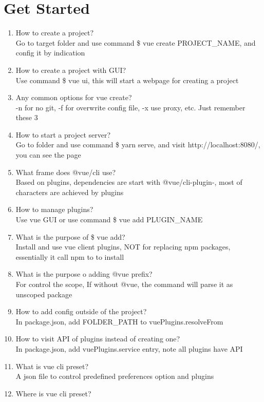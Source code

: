 \documentclass[10pt,a4paper,oneside]{article}
\begin{document}
\section{Get Started}
\begin{enumerate}[1.]
\item  How to create a project?  \\
Go to target folder and use command \$ vue create PROJECT\_NAME, and config it by indication
\item  How to create a project with GUI?  \\
Use command \$ vue ui, this will start a webpage for creating a project
\item  Any common options for vue create?  \\
-n for no git, -f for overwrite config file, -x use proxy, etc. Just remember these 3
\item  How to start a project server?  \\
Go to folder and use command \$ yarn serve, and visit http://localhost:8080/, you can see the page
\item  What frame does @vue/cli use?  \\
Based on plugins, dependencies are start with @vue/cli-plugin-, most of characters are achieved by plugins
\item   How to manage plugins? \\
Use vue GUI or use command \$ vue add PLUGIN\_NAME
\item What is the purpose of \$ vue add?   \\
Install and use vue client plugins, NOT for replacing npm packages, essentially it call npm to to install
\item  What is the purpose o adding @vue prefix?  \\
For control the scope, If without @vue, the command will parse it as unscoped package
\item  How to add config outside of the project?  \\
In package.json, add FOLDER\_PATH to vuePlugins.resolveFrom
\item  How to visit API of plugins instead of creating one?  \\
In package.json, add vuePlugins.service entry, note all plugins have API
\item  What is vue cli preset?   \\
A json file to control predefined preferences option and plugins
\item  Where is vue cli preset?  \\

\end{enumerate}
\end{document}
